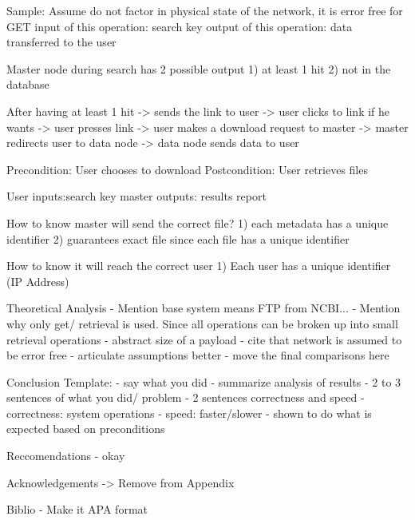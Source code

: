 Sample:
Assume do not factor in physical state of the network, it is error free
for GET
input of this operation: search key
output of this operation: data transferred to the user

Master node during search has 2 possible output
1) at least 1 hit
2) not in the database

After having at least 1 hit
-> sends the link to user
-> user clicks to link if he wants
-> user presses link
-> user makes a download request to master
-> master redirects user to data node
-> data node sends data to user

Precondition: User chooses to download
Postcondition: User retrieves files

User inputs:search key
master outputs: results report

How to know master will send the correct file?
1) each metadata has a unique identifier
2) guarantees exact file since each file has a unique identifier

How to know it will reach the correct user
1) Each user has a unique identifier (IP Address)

Theoretical Analysis
- Mention base system means FTP from NCBI...
- Mention why only get/ retrieval is used. Since all operations can be broken up into small retrieval operations
- abstract size of a payload
- cite that network is assumed to be error free
- articulate assumptions better
- move the final comparisons here

Conclusion Template:
- say what you did
- summarize analysis of results
- 2 to 3 sentences of what you did/ problem
- 2 sentences correctness and speed
- correctness: system operations
- speed: faster/slower
- shown to do what is expected based on preconditions

Reccomendations
- okay

Acknowledgements -> Remove from Appendix

Biblio
- Make it APA format